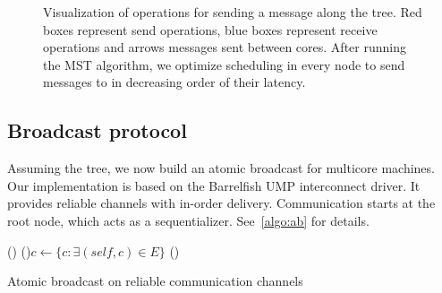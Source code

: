 \documentclass{article}
\begin{document}
\begin{figure}[htb]
  \centering
  \begin{tikzpicture}[scale=.35,transform shape]
    
  \end{tikzpicture}
  \caption{Visualization of operations for sending a message along the
    tree. Red boxes represent send operations, blue boxes represent
    receive operations and arrows messages sent between cores. After
    running the MST algorithm, we optimize scheduling in every node to
    send messages to in decreasing order of their latency.}
  \label{fig:mst_gruyere_operations_sorted}
\end{figure}

\subsection{Broadcast protocol}

Assuming the tree, we now build an atomic broadcast for multicore
machines. Our implementation is based on the Barrelfish UMP
interconnect driver. It provides reliable channels with in-order
delivery. Communication starts at the root node, which acts as a
sequentializer. See~\ref{algo:ab} for details.

\newcommand{\textc}[1]{{\color{gray} {\footnotesize #1}}}
\begin{algorithm}[H]
%
%
%
%
%
%
%
  \BlankLine
  \Fn(){}{
    \For(){$c \leftarrow \{ c: \exists (self, c) \in E \} $}{
    }
    \waitchild{}\;
    \;
  }
  \BlankLine
  \Fn(){}{
  }
  \caption{Atomic broadcast on reliable communication channels}
  \label{algo:ab}

\end{algorithm}
\end{document}
